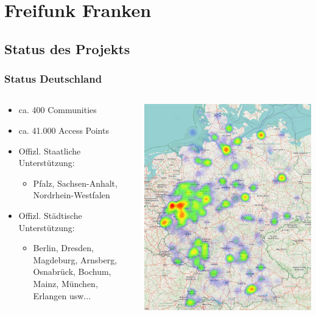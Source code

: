 \section{Freifunk Franken}
\subsection{Status des Projekts}

\begin{frame}
\frametitle{Status Deutschland}
	\begin{columns}[c]   
		\begin{column}[T]{0.6\textwidth}     
			\begin{itemize}
				\item ca. 400 Communities \footnotemark[1]
				\item ca. 41.000 Access Points \footnotemark[1]
				\item Offizl. Staatliche Unterstützung:
				\begin{itemize}
					\item Pfalz, Sachsen-Anhalt, Nordrhein-Westfalen 
				\end{itemize}
				\item Offizl. Städtische Unterstützung:
				\begin{itemize}
					\item Berlin, Dresden, Magdeburg, Arnsberg, Osnabrück, Bochum, Mainz, München, Erlangen usw...
				\end{itemize}
			\end{itemize}
		\end{column}
		\begin{column}[T]{0.4\textwidth}     
			\includegraphics[width=\textwidth]{images/heatmap_germany.png} 

\end{column}
\end{columns}
\end{frame}
